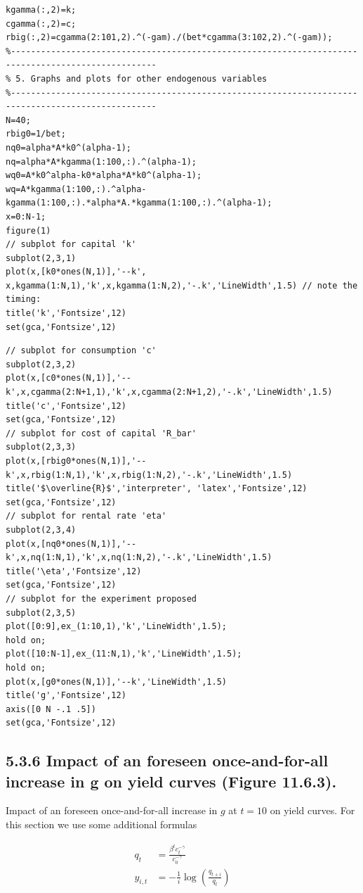 \documentclass[10pt]{article}
\begin{document}
\begin{verbatim}
kgamma(:,2)=k;
cgamma(:,2)=c;
rbig(:,2)=cgamma(2:101,2).^(-gam)./(bet*cgamma(3:102,2).^(-gam));
%---------------------------------------------------------------------------------------------------
% 5. Graphs and plots for other endogenous variables
%---------------------------------------------------------------------------------------------------
N=40;
rbig0=1/bet;
nq0=alpha*A*k0^(alpha-1);
nq=alpha*A*kgamma(1:100,:).^(alpha-1);
wq0=A*k0^alpha-k0*alpha*A*k0^(alpha-1);
wq=A*kgamma(1:100,:).^alpha-kgamma(1:100,:).*alpha*A.*kgamma(1:100,:).^(alpha-1);
x=0:N-1;
figure(1)
// subplot for capital 'k'
subplot(2,3,1)
plot(x,[k0*ones(N,1)],'--k', x,kgamma(1:N,1),'k',x,kgamma(1:N,2),'-.k','LineWidth',1.5) // note the timing:
title('k','Fontsize',12)
set(gca,'Fontsize',12)
\end{verbatim}

\begin{verbatim}
// subplot for consumption 'c'
subplot(2,3,2)
plot(x,[c0*ones(N,1)],'--k',x,cgamma(2:N+1,1),'k',x,cgamma(2:N+1,2),'-.k','LineWidth',1.5)
title('c','Fontsize',12)
set(gca,'Fontsize',12)
// subplot for cost of capital 'R_bar'
subplot(2,3,3)
plot(x,[rbig0*ones(N,1)],'--k',x,rbig(1:N,1),'k',x,rbig(1:N,2),'-.k','LineWidth',1.5)
title('$\overline{R}$','interpreter', 'latex','Fontsize',12)
set(gca,'Fontsize',12)
// subplot for rental rate 'eta'
subplot(2,3,4)
plot(x,[nq0*ones(N,1)],'--k',x,nq(1:N,1),'k',x,nq(1:N,2),'-.k','LineWidth',1.5)
title('\eta','Fontsize',12)
set(gca,'Fontsize',12)
// subplot for the experiment proposed
subplot(2,3,5)
plot([0:9],ex_(1:10,1),'k','LineWidth',1.5);
hold on;
plot([10:N-1],ex_(11:N,1),'k','LineWidth',1.5);
hold on;
plot(x,[g0*ones(N,1)],'--k','LineWidth',1.5)
title('g','Fontsize',12)
axis([0 N -.1 .5])
set(gca,'Fontsize',12)
\end{verbatim}

\subsection*{5.3.6 Impact of an foreseen once-and-for-all increase in g on yield curves (Figure 11.6.3).}
Impact of an foreseen once-and-for-all increase in $g$ at $t=10$ on yield curves. For this section we use some additional formulas


\begin{align*}
q_{t} & =\frac{\beta^{t} c_{t}^{-\gamma}}{c_{0}^{-\gamma}}  \tag{20}\\
y_{i, t} & =-\frac{1}{i} \log \left(\frac{q_{t+i}}{q_{t}}\right) \tag{21}
\end{align*}
\end{document}
